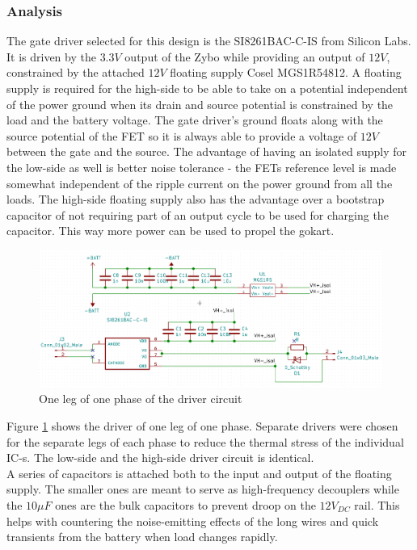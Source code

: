 \subsubsection{Analysis}
The gate driver selected for this design is the SI8261BAC-C-IS\cite{Si8261} from Silicon Labs. It is driven by the $3.3V$ output of the Zybo while providing an output of $12V$, constrained by the attached $12V$ floating supply Cosel MGS1R54812\cite{MGS1R5}. A floating supply is required for the high-side to be able to take on a potential independent of the power ground when its drain and source potential is constrained by the load and the battery voltage. The gate driver's ground floats along with the source potential of the FET so it is always able to provide a voltage of $12V$ between the gate and the source. The advantage of having an isolated supply for the low-side as well is better noise tolerance - the FETs reference level is made somewhat independent of the ripple current on the power ground from all the loads. The high-side floating supply also has the advantage over a bootstrap capacitor of not requiring  part of an output cycle to be used for charging the capacitor. This way more power can be used to propel the gokart.

\begin{figure}[H]
	\centering
	\includegraphics[width=0.6\linewidth]{pictures/hardware/Driver_Board/driver_circuit.png}
	\caption{One leg of one phase of the driver circuit}
	\label{fig:driver_circuit}
\end{figure}

 Figure \ref{fig:driver_circuit} shows the driver of one leg of one phase. Separate drivers were chosen for the separate legs of each phase to reduce the thermal stress of the individual IC-s. The low-side and the high-side driver circuit is identical. \\

A series of capacitors is attached both to the input and output of the floating supply. The smaller ones are meant to serve as high-frequency decouplers while the $10$$\mu$$F$  ones are the bulk capacitors to prevent droop on the $12V_{DC}$ rail. This helps with countering the noise-emitting effects of the long wires and quick transients from the battery when load changes rapidly. \\

